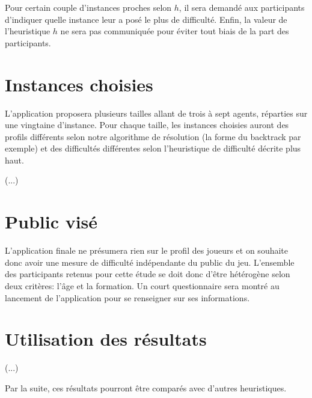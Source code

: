 \documentclass[a4paper, 10pt]{article}
\begin{document}
	Pour certain couple d'instances proches selon $h$, il sera demandé aux participants d'indiquer quelle instance leur a posé le plus de difficulté. Enfin, la valeur de l'heuristique $h$ ne sera pas communiquée pour éviter tout biais de la part des participants. 
	
	\section*{Instances choisies}
	
	L'application proposera plusieurs tailles allant de trois à sept agents, réparties sur une vingtaine d'instance. Pour chaque taille, les instances choisies auront des profils différents selon notre algorithme de résolution (la forme du backtrack par exemple) et des difficultés différentes selon l'heuristique de difficulté décrite plus haut.
	
	(...)
	
	\section*{Public visé}
	
	L'application finale ne présumera rien sur le profil des joueurs et on souhaite donc avoir une mesure de difficulté indépendante du public du jeu. L'ensemble des participants retenus pour cette étude se doit donc d'être hétérogène selon deux critères: l'âge et la formation. Un court questionnaire sera montré au lancement de l'application pour se renseigner sur ses informations.
	
	\section*{Utilisation des résultats}
	
	(...)
	
	Par la suite, ces résultats pourront être comparés avec d'autres heuristiques.
	
\end{document}
